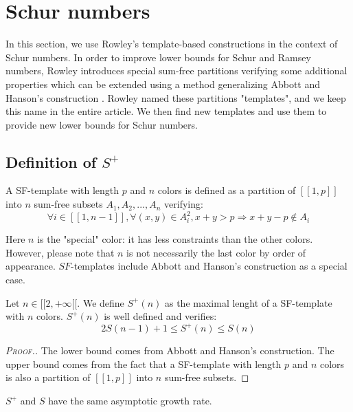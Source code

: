 \section{Schur numbers}
\label{Schur}

\qquad In this section, we use Rowley's template-based constructions \cite{RowleyRamsey} in the context of Schur 
numbers. In order to improve lower bounds for Schur and Ramsey numbers, Rowley introduces special sum-free 
partitions verifying some additional properties which can be extended using a method generalizing Abbott and 
Hanson's construction \cite{AbbottHanson}. Rowley named these partitions "templates", and we keep this name in 
the entire article. We then find new templates and use them to provide new lower bounds for Schur numbers.

\subsection{Definition of \(S^+\)}

\begin{definition}
A SF-template with length \(p\) and \(n\) colors is defined as a partition of \( [\![1,p]\!]\) into \(n\) sum-free subsets 
\(A_1, A_2, ..., A_n\) verifying:
\[
\forall i \in [\![1, n-1]\!], \forall (x,y) \in A_i^2, x+y > p
\Longrightarrow x+y-p \notin A_i
\]
\end{definition}

Here \(n\) is the "special" color: it has less constraints than the other colors. However, please note that \(n\) 
is not necessarily the last color by order of appearance. \(SF\)-templates include Abbott and Hanson's construction \cite{AbbottHanson}
as a special case.

\begin{proposition}
	Let \(n \in [\![2, +\infty[\![\). We define \(S^+(n)\) as the maximal lenght of a SF-template with \(n\) colors. 
	\(S^+(n)\) is well defined and verifies:
	\[
	2S(n-1)+1 \leqslant S^+(n) \leqslant S(n)
	\]
\end{proposition}

\begin{proof}[\textsc{Proof.}]
The lower bound comes from Abbott and Hanson's construction. The upper bound comes from the 
fact that a SF-template with length \(p\) and \(n\) colors is also a partition of \([\![1, p]\!]\) into \(n\) sum-free subsets.
\end{proof}

\begin{remark}
	\(S^+\) and \(S\) have the same asymptotic growth rate.
\end{remark}


